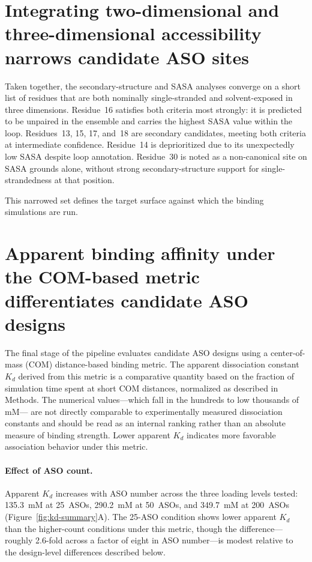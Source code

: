 \section{Integrating two-dimensional and three-dimensional accessibility
         narrows candidate ASO sites}
\label{sec:results-integration}

Taken together, the secondary-structure and SASA analyses converge on a short
list of residues that are both nominally single-stranded and solvent-exposed
in three dimensions.
Residue~16 satisfies both criteria most strongly: it is predicted to be
unpaired in the ensemble and carries the highest SASA value within the loop.
Residues~13, 15, 17, and~18 are secondary candidates, meeting both criteria at
intermediate confidence.
Residue~14 is deprioritized due to its unexpectedly low SASA despite loop
annotation.
Residue~30 is noted as a non-canonical site on SASA grounds alone, without
strong secondary-structure support for single-strandedness at that position.

This narrowed set defines the target surface against which the binding
simulations are run.


\section{Apparent binding affinity under the COM-based metric differentiates
         candidate ASO designs}
\label{sec:results-binding}

The final stage of the pipeline evaluates candidate ASO designs using a
center-of-mass (COM) distance-based binding metric.
The apparent dissociation constant $K_d$ derived from this metric is a
comparative quantity based on the fraction of simulation time spent at
short COM distances, normalized as described in Methods.
The numerical values---which fall in the hundreds to low thousands of mM---
are not directly comparable to experimentally measured dissociation constants
and should be read as an internal ranking rather than an absolute measure
of binding strength.
Lower apparent $K_d$ indicates more favorable association behavior
under this metric.

\paragraph{Effect of ASO count.}
Apparent $K_d$ increases with ASO number across the three loading levels
tested: 135.3~mM at 25~ASOs, 290.2~mM at 50~ASOs, and 349.7~mM at
200~ASOs (Figure~\ref{fig:kd-summary}A).
The 25-ASO condition shows lower apparent $K_d$ than the higher-count
conditions under this metric, though the difference---roughly 2.6-fold
across a factor of eight in ASO number---is modest relative to the
design-level differences described below.

